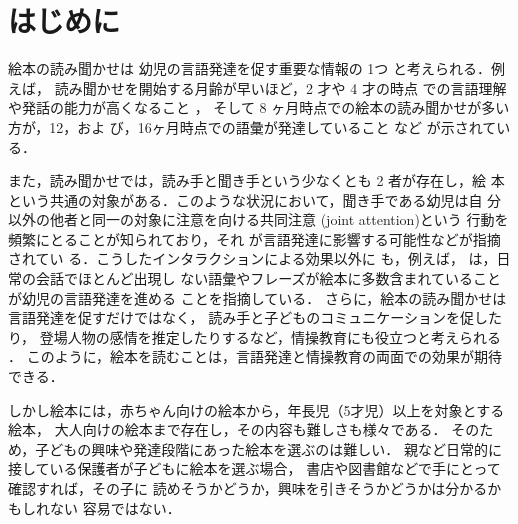 \documentclass[japanese]{jnlp_1.4}
\newcommand{\changedB}[1]{}
\renewcommand{\changedB}[1]{}
\begin{document}
\maketitle


\section{はじめに}\label{sec:intro}

絵本の読み聞かせは
幼児の言語発達を促す重要な情報の 1つ
と考えられる\cite{Mol:2008,Reese:1999,Whitehurst:1988}．例えば，
読み聞かせを開始する月齢が早いほど，2 才や 4 才の時点
での言語理解や発話の能力が高くなること
\cite{Debaryshe:1993:joint,Payne:1994:role}，
そして 8 ヶ月時点での絵本の読み聞かせが多い方が，12，およ
び，16ヶ月時点での語彙が発達していること\cite{Karrass:2005:effects} など
が示されている．


また，読み聞かせでは，読み手と聞き手という少なくとも 2 者が存在し，絵
本という共通の対象がある．このような状況において，聞き手である幼児は自
分以外の他者と同一の対象に注意を向ける共同注意 (joint attention)という
行動を頻繁にとることが知られており\cite{Karrass:2003:predicting}，それ
が言語発達に影響する可能性などが指摘されてい
る\cite{Tomasello:1986:joint}．こうしたインタラクションによる効果以外に
も，例えば， は，日常の会話でほとんど出現し
ない語彙やフレーズが絵本に多数含まれていることが幼児の言語発達を進める
ことを指摘している．
さらに，絵本の読み聞かせは言語発達を促すだけではなく，
読み手と子どものコミュニケーションを促したり，
登場人物の感情を推定したりするなど，情操教育にも役立つと考えられる
\cite{Sato:Horikawa:Uchiyama:2016j,Furumi:Koyamauti:Ooba:2014j}．
このように，絵本を読むことは，言語発達と情操教育の両面での効果が期待できる．



しかし絵本には，赤ちゃん向けの絵本から，年長児（5才児）以上を対象とする絵本，
大人向けの絵本まで存在し，その内容も難しさも様々である．
そのため，子どもの興味や発達段階にあった絵本を選ぶのは難しい．
親など日常的に接している保護者が子どもに絵本を選ぶ場合，
書店や図書館などで手にとって確認すれば，その子に
読めそうかどうか，興味を引きそうかどうかは分かるかもしれない
\changedB{が，非常に多くの絵本を 1 冊 1 冊手に取って確認するのは}容易ではない．
\end{document}
